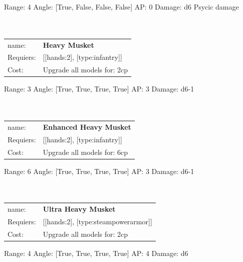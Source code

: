 Range: 4  Angle: [True, False, False, False] AP: 0 Damage: d6 Psycic damage \\








\ \\
\ \\
\begin{tabular}{ll}
name: & {\bf Heavy Musket } \\
Requiers: & [[hands:2], [type:infantry]] \\
Cost: & Upgrade all models for: 2cp \\
\end{tabular}



Range: 3  Angle: [True, True, True, True] AP: 3 Damage: d6-1 \\








\ \\
\ \\
\begin{tabular}{ll}
name: & {\bf Enhanced Heavy Musket } \\
Requiers: & [[hands:2], [type:infantry]] \\
Cost: & Upgrade all models for: 6cp \\
\end{tabular}



Range: 6  Angle: [True, True, True, True] AP: 3 Damage: d6-1 \\








\ \\
\ \\
\begin{tabular}{ll}
name: & {\bf Ultra Heavy Musket } \\
Requiers: & [[hands:2], [type:steampowerarmor]] \\
Cost: & Upgrade all models for: 2cp \\
\end{tabular}



Range: 4  Angle: [True, True, True, True] AP: 4 Damage: d6 \\








